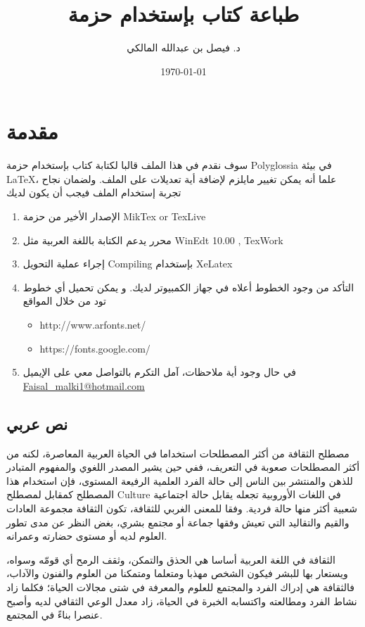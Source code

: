 \documentclass[a4 paper]{report}
\title{طباعة كتاب بإستخدام حزمة \\
\eng{Polyglossia}}
\author{د. فيصل بن عبدالله المالكي}
\date{\today}
\theoremstyle{mystyle}
\theoremstyle{Excercises}
\newcommand{\eng}{\textenglish}  %
\begin{document}
\maketitle
\tableofcontents
\doublespacing
\chapter{ مقدمة}

سوف نقدم في هذا الملف قالبا لكتابة كتاب بإستخدام حزمة 
\eng{Polyglossia}
في بيئة \eng{\LaTeX}، علما أنه يمكن تغيير مايلزم لإضافة أية تعديلات على الملف. ولضمان نجاح تجربة إستخدام الملف فيجب أن يكون لديك
\begin{enumerate}
  \item الإصدار الأخير من حزمة \eng{MikTex or TexLive}
  \item محرر يدعم الكتابة باللغة العربية مثل \eng{WinEdt 10.00 , TexWork}
  \item إجراء عملية التحويل \eng{Compiling} بإستخدام \eng{XeLatex}
  \item التأكد من وجود الخطوط أعلاه في جهاز الكمبيوتر لديك. و يمكن تحميل أي خطوط تود من خلال المواقع
  \setLR
  \begin{itemize}
    \item http://www.arfonts.net/
    \item https://fonts.google.com/
  \end{itemize}
  \setRL
  \item  في حال وجود أية ملاحظات، آمل التكرم بالتواصل معي على الإيميل
  \href{mailto:Faisal_malki1@hotmail.com}{Faisal\_malki1@hotmail.com}
\end{enumerate}

\section{نص عربي}

مصطلح الثقافة من أكثر المصطلحات استخداما في الحياة العربية المعاصرة، لكنه من أكثر المصطلحات صعوبة في التعريف، ففي حين يشير المصدر اللغوي والمفهوم المتبادر للذهن والمنتشر بين الناس إلى حالة الفرد العلمية الرفيعة المستوى، فإن استخدام هذا المصطلح كمقابل لمصطلح \eng{Culture} في اللغات الأوروبية تجعله يقابل حالة اجتماعية شعبية أكثر منها حالة فردية. وفقا للمعنى الغربي للثقافة، تكون الثقافة مجموعة العادات والقيم والتقاليد التي تعيش وفقها جماعة أو مجتمع بشري، بغض النظر عن مدى تطور العلوم لديه أو مستوى حضارته وعمرانه.

الثقافة في اللغة العربية أساسا هي الحذق والتمكن، وثقف الرمح أي قومّه وسواه، ويستعار بها للبشر فيكون الشخص مهذبا ومتعلما ومتمكنا من العلوم والفنون والآداب، فالثقافة هي إدراك الفرد والمجتمع للعلوم والمعرفة في شتى مجالات الحياة؛ فكلما زاد نشاط الفرد ومطالعته واكتسابه الخبرة في الحياة، زاد معدل الوعي الثقافي لديه وأصبح عنصرا بناءً في المجتمع.
\end{document}
